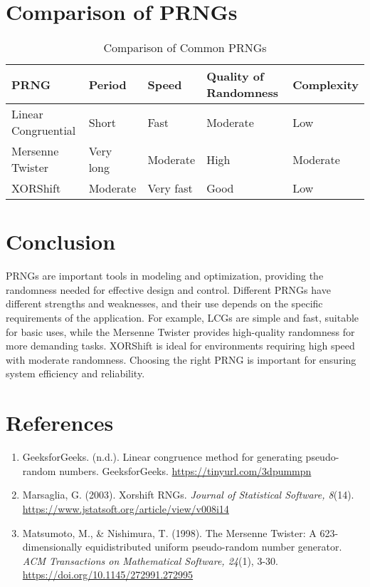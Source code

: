 \documentclass[a4paper,12pt]{report}
\begin{document}
\newpage
\section{Comparison of PRNGs}
\begin{table}[h!]
\centering
\begin{tabular}{|l|l|l|l|l|}
\hline
\textbf{PRNG} & \textbf{Period} & \textbf{Speed} & \textbf{Quality of Randomness} & \textbf{Complexity} \\ \hline
Linear Congruential & Short & Fast & Moderate & Low \\ \hline
Mersenne Twister & Very long & Moderate & High & Moderate \\ \hline
XORShift & Moderate & Very fast & Good & Low \\ \hline

\end{tabular}
\caption{Comparison of Common PRNGs}
\end{table}

\section{Conclusion}
PRNGs are important tools in modeling and optimization, providing the randomness needed for effective design and control. Different PRNGs have different strengths and weaknesses, and their use depends on the specific requirements of the application. For example, LCGs are simple and fast, suitable for basic uses, while the Mersenne Twister provides high-quality randomness for more demanding tasks. XORShift is ideal for environments requiring high speed with moderate randomness. Choosing the right PRNG is important for ensuring system efficiency and reliability.

\newpage
\section{References}
\begin{enumerate}
    \item GeeksforGeeks. (n.d.). Linear congruence method for generating pseudo-random numbers. GeeksforGeeks. \url{https://tinyurl.com/3dpummpn}
    
    \item Marsaglia, G. (2003). Xorshift RNGs. \textit{Journal of Statistical Software, 8}(14). \url{https://www.jstatsoft.org/article/view/v008i14}
    
    \item Matsumoto, M., \& Nishimura, T. (1998). The Mersenne Twister: A 623-dimensionally equidistributed uniform pseudo-random number generator. \textit{ACM Transactions on Mathematical Software, 24}(1), 3-30. \url{https://doi.org/10.1145/272991.272995}
\end{enumerate}
\end{document}
